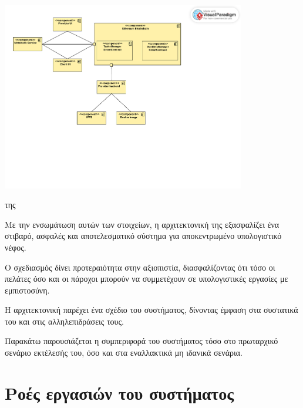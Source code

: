 \begin{illustration}
    \centering
    \includegraphics[width=0.8\textwidth]{figures/figure-004.pdf}
    \caption{ της } 
\end{illustration}

Με την ενσωμάτωση αυτών των στοιχείων, η αρχιτεκτονική της  εξασφαλίζει ένα στιβαρό, ασφαλές και αποτελεσματικό σύστημα για αποκεντρωμένο υπολογιστικό νέφος. 

Ο σχεδιασμός δίνει προτεραιότητα στην αξιοπιστία, διασφαλίζοντας ότι τόσο οι πελάτες όσο και οι πάροχοι μπορούν να συμμετέχουν σε υπολογιστικές εργασίες με εμπιστοσύνη.

Η αρχιτεκτονική παρέχει ένα σχέδιο του συστήματος, δίνοντας έμφαση στα συστατικά του 
και στις αλληλεπιδράσεις τους. 

Παρακάτω παρουσιάζεται η συμπεριφορά του συστήματος τόσο στο πρωταρχικό σενάριο εκτέλεσής του, όσο και στα εναλλακτικά μη ιδανικά σενάρια.

\section{Ροές εργασιών του συστήματος}

